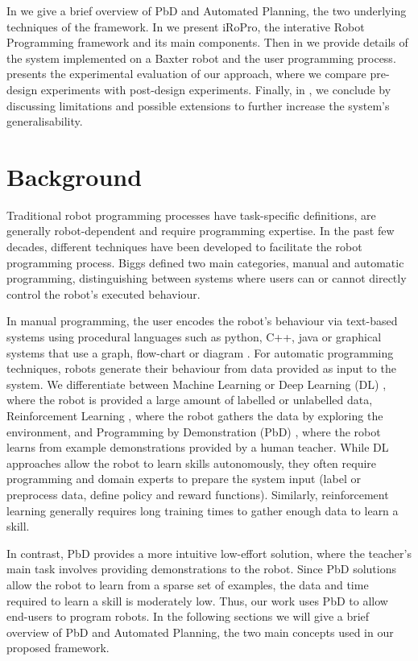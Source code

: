 In  we give a brief overview of PbD and Automated Planning, the two underlying techniques of the framework.
In  we present iRoPro, the interative Robot Programming framework and its main components.
Then in  we provide details of the system implemented on a Baxter robot and the user programming process.
 presents the experimental evaluation of our approach, where we compare pre-design experiments with post-design experiments.
Finally, in , we conclude by discussing limitations and possible extensions to further increase the system's generalisability.

\section{Background}\label{sec:background}
Traditional robot programming processes have task-specific definitions, are generally robot-dependent and require programming expertise.
In the past few decades, different techniques have been developed to facilitate the robot programming process. 
Biggs \etal \cite{Biggs2003} defined two main categories, manual and automatic programming, distinguishing between systems where users can or cannot directly control the robot's executed behaviour.

In manual programming, the user encodes the robot's behaviour via text-based systems using procedural languages such as python, C++, java or graphical systems that use a graph, flow-chart or diagram \cite{lego2003,fraser2013blockly,majed2014learn}.
For automatic programming techniques, robots generate their behaviour from data provided as input to the system. 
We differentiate between Machine Learning or Deep Learning (DL) \cite{schmidhuber2015deep}, where the robot is provided a large amount of labelled or unlabelled data, Reinforcement Learning \cite{kaelbling1996reinforcement,gosavi2009reinforcement}, where the robot gathers the data by exploring the environment, and Programming by Demonstration (PbD) \cite{billard2008robot,argall2009survey}, where the robot learns from example demonstrations provided by a human teacher.
While DL approaches allow the robot to learn skills autonomously, they often require programming and domain experts to prepare the system input (\eg label or preprocess data, define policy and reward functions). 
Similarly, reinforcement learning generally requires long training times to gather enough data to learn a skill.

In contrast, PbD provides a more intuitive low-effort solution, where the teacher's main task involves providing demonstrations to the robot.
Since PbD solutions allow the robot to learn from a sparse set of examples, the data and time required to learn a skill is moderately low.
Thus, our work uses PbD to allow end-users to program robots.
In the following sections we will give a brief overview of PbD and Automated Planning, the two main concepts used in our proposed framework.

